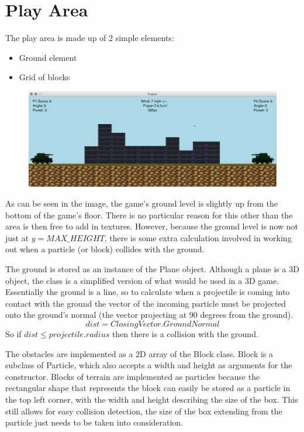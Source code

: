 \documentclass[12pt]{article}
\begin{document}
\section{Play Area}
The play area is made up of 2 simple elements:
\begin{itemize}
\item Ground element
\item Grid of blocks
\end{itemize}
\begin{figure}[H]
\centerline{\includegraphics[width=17cm]{fired}}
\end{figure}
As can be seen in the image, the game's ground level is slightly up from the bottom of the game's floor. There is no particular reason for this other than the area is then free to add in textures. However, because the ground level is now not just at $ y = MAX\_HEIGHT $, there is some extra calculation involved in working out when a particle (or block) collides with the ground.
\par 
The ground is stored as an instance of the Plane object. Although a plane is a 3D object, the class is a simplified version of what would be used in a 3D game. Essentially the ground is a line, so to calculate when a projectile is coming into contact with the ground the vector of the incoming particle must be projected onto the ground's normal (the vector projecting at 90 degrees from the ground).
$$ dist = ClosingVector . GroundNormal $$
So if $ dist \leq projectile.radius $ then there is a collision with the ground.
\par 
The obstacles are implemented as a 2D array of the Block class. Block is a subclass of Particle, which also accepts a width and height as arguments for the constructor. Blocks of terrain are implemented as particles because the rectangular shape that represents the block can easily be stored as a particle in the top left corner, with the width and height describing the size of the box. This still allows for easy collision detection, the size of the box extending from the particle just needs to be taken into consideration.
\par 
\end{document}
